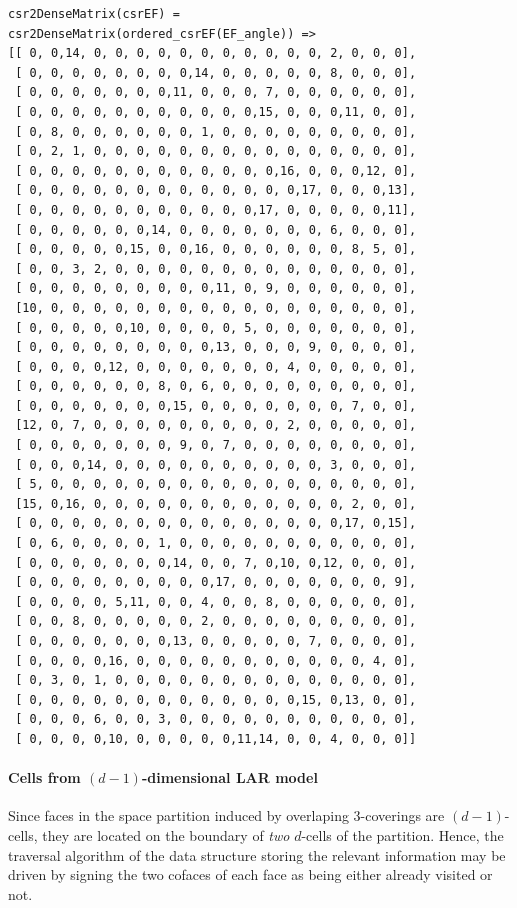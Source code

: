 \documentclass[11pt,oneside]{article}    %
\begin{document}
{\small
\begin{verbatim}
csr2DenseMatrix(csrEF) = 
csr2DenseMatrix(ordered_csrEF(EF_angle)) =>
[[ 0, 0,14, 0, 0, 0, 0, 0, 0, 0, 0, 0, 0, 0, 2, 0, 0, 0],
 [ 0, 0, 0, 0, 0, 0, 0, 0,14, 0, 0, 0, 0, 0, 8, 0, 0, 0],
 [ 0, 0, 0, 0, 0, 0, 0,11, 0, 0, 0, 7, 0, 0, 0, 0, 0, 0],
 [ 0, 0, 0, 0, 0, 0, 0, 0, 0, 0, 0,15, 0, 0, 0,11, 0, 0],
 [ 0, 8, 0, 0, 0, 0, 0, 0, 1, 0, 0, 0, 0, 0, 0, 0, 0, 0],
 [ 0, 2, 1, 0, 0, 0, 0, 0, 0, 0, 0, 0, 0, 0, 0, 0, 0, 0],
 [ 0, 0, 0, 0, 0, 0, 0, 0, 0, 0, 0, 0,16, 0, 0, 0,12, 0],
 [ 0, 0, 0, 0, 0, 0, 0, 0, 0, 0, 0, 0, 0,17, 0, 0, 0,13],
 [ 0, 0, 0, 0, 0, 0, 0, 0, 0, 0, 0,17, 0, 0, 0, 0, 0,11],
 [ 0, 0, 0, 0, 0, 0,14, 0, 0, 0, 0, 0, 0, 0, 6, 0, 0, 0],
 [ 0, 0, 0, 0, 0,15, 0, 0,16, 0, 0, 0, 0, 0, 0, 8, 5, 0],
 [ 0, 0, 3, 2, 0, 0, 0, 0, 0, 0, 0, 0, 0, 0, 0, 0, 0, 0],
 [ 0, 0, 0, 0, 0, 0, 0, 0, 0,11, 0, 9, 0, 0, 0, 0, 0, 0],
 [10, 0, 0, 0, 0, 0, 0, 0, 0, 0, 0, 0, 0, 0, 0, 0, 0, 0],
 [ 0, 0, 0, 0, 0,10, 0, 0, 0, 0, 5, 0, 0, 0, 0, 0, 0, 0],
 [ 0, 0, 0, 0, 0, 0, 0, 0, 0,13, 0, 0, 0, 9, 0, 0, 0, 0],
 [ 0, 0, 0, 0,12, 0, 0, 0, 0, 0, 0, 0, 4, 0, 0, 0, 0, 0],
 [ 0, 0, 0, 0, 0, 0, 8, 0, 6, 0, 0, 0, 0, 0, 0, 0, 0, 0],
 [ 0, 0, 0, 0, 0, 0, 0,15, 0, 0, 0, 0, 0, 0, 0, 7, 0, 0],
 [12, 0, 7, 0, 0, 0, 0, 0, 0, 0, 0, 0, 2, 0, 0, 0, 0, 0],
 [ 0, 0, 0, 0, 0, 0, 0, 9, 0, 7, 0, 0, 0, 0, 0, 0, 0, 0],
 [ 0, 0, 0,14, 0, 0, 0, 0, 0, 0, 0, 0, 0, 0, 3, 0, 0, 0],
 [ 5, 0, 0, 0, 0, 0, 0, 0, 0, 0, 0, 0, 0, 0, 0, 0, 0, 0],
 [15, 0,16, 0, 0, 0, 0, 0, 0, 0, 0, 0, 0, 0, 0, 2, 0, 0],
 [ 0, 0, 0, 0, 0, 0, 0, 0, 0, 0, 0, 0, 0, 0, 0,17, 0,15],
 [ 0, 6, 0, 0, 0, 0, 1, 0, 0, 0, 0, 0, 0, 0, 0, 0, 0, 0],
 [ 0, 0, 0, 0, 0, 0, 0,14, 0, 0, 7, 0,10, 0,12, 0, 0, 0],
 [ 0, 0, 0, 0, 0, 0, 0, 0, 0,17, 0, 0, 0, 0, 0, 0, 0, 9],
 [ 0, 0, 0, 0, 5,11, 0, 0, 4, 0, 0, 8, 0, 0, 0, 0, 0, 0],
 [ 0, 0, 8, 0, 0, 0, 0, 0, 2, 0, 0, 0, 0, 0, 0, 0, 0, 0],
 [ 0, 0, 0, 0, 0, 0, 0,13, 0, 0, 0, 0, 0, 7, 0, 0, 0, 0],
 [ 0, 0, 0, 0,16, 0, 0, 0, 0, 0, 0, 0, 0, 0, 0, 0, 4, 0],
 [ 0, 3, 0, 1, 0, 0, 0, 0, 0, 0, 0, 0, 0, 0, 0, 0, 0, 0],
 [ 0, 0, 0, 0, 0, 0, 0, 0, 0, 0, 0, 0, 0,15, 0,13, 0, 0],
 [ 0, 0, 0, 6, 0, 0, 3, 0, 0, 0, 0, 0, 0, 0, 0, 0, 0, 0],
 [ 0, 0, 0, 0,10, 0, 0, 0, 0, 0,11,14, 0, 0, 4, 0, 0, 0]]
\end{verbatim}}

\paragraph{Cells from $(d-1)$-dimensional LAR model}
Since faces in the space partition induced by overlaping 3-coverings are $(d-1)$-cells, they are located on the boundary of \emph{two} $d$-cells of the partition. Hence, the traversal algorithm of the data structure storing the relevant information may be driven by signing the two cofaces of each face as being either already visited or not.
\end{document}
